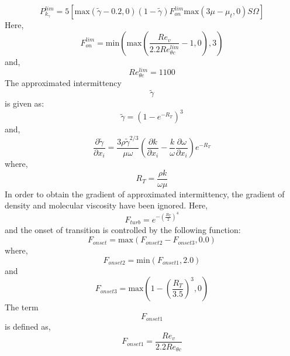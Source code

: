 \begin{equation}
  P_{k_\gamma}^{lim} = 5\left[\text{max}(\widetilde{\gamma} - 0.2, 0)(1-\widetilde{\gamma})F_{on}^{lim}\text{max}(3\mu - \mu_t,0)S\Omega\right]
\end{equation}
Here,
\begin{equation}
  F_{on}^{lim} = \text{min}\left(\text{max}\left(\frac{Re_v}{2.2Re_{\theta c}^{lim}}-1, 0\right),3\right)
\end{equation}
and,
\begin{equation}
  Re_{\theta c}^{lim} = 1100
\end{equation}
The approximated intermittency 
\begin{equation}
\widetilde{\gamma}
\end{equation}
is given as:
\begin{equation}
\widetilde{\gamma} = \left(1-e^{-R_T}\right)^3
\end{equation}
and,
\begin{equation}
  \frac{\partial \widetilde{\gamma}}{\partial x_i} = \frac{3\rho\widetilde{\gamma}^{2/3}}{\mu \omega} \left(\frac{\partial k}{\partial x_i} - \frac{k}{\omega}\frac{\partial \omega}{\partial x_i}\right)e^{-R_T}
\end{equation}
where, 
\begin{equation}
    R_T = \frac{\rho k}{\omega \mu}
\end{equation}
In order to obtain the gradient of approximated intermittency, the gradient of density and molecular viscosity  have been ignored. 
Here,
\begin{equation}
  F_{turb} = e^{-\left(\frac{R_T}{2}\right)^4}
\end{equation}
and the onset of transition is controlled by the following function:
\begin{equation}
 F_{onset}  = \text{max}(F_{onset2} - F_{onset3}, 0.0) 
\end{equation}
where, 
\begin{equation}
    F_{onset2} = \text{min}(F_{onset1}, 2.0)
\end{equation}
and
\begin{equation}
    F_{onset3} = \text{max}\left( 1 - \left(\frac{R_T}{3.5}\right)^3, 0\right)
\end{equation}
The term 
\begin{equation}
F_{onset1}
\end{equation}
is defined as, 
\begin{equation} 
F_{onset1} = \frac{Re_v}{2.2Re_{\theta c}}
\end{equation}
